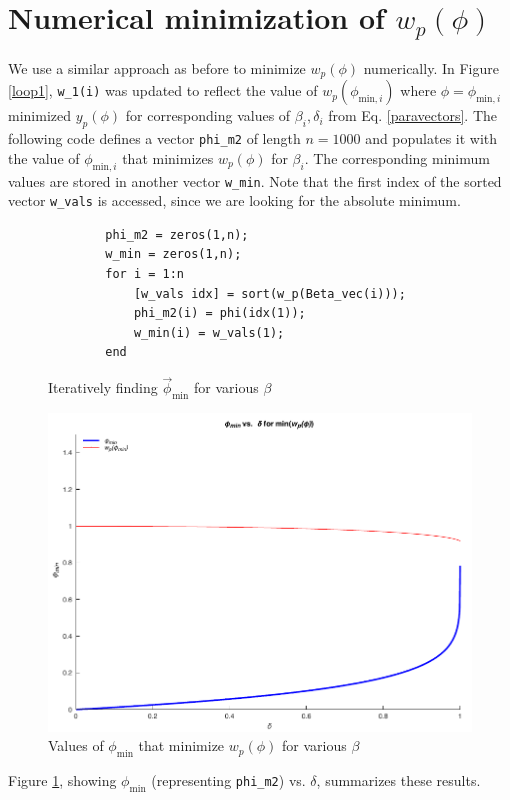 \section{Numerical minimization of \texorpdfstring{$w_p(\phi)$}{}}

We use a similar approach as before to minimize $w_p(\phi)$ numerically. 
In Figure \ref{loop1}, \verb|w_1(i)| was updated
to reflect the value of $w_p(\phi_{\mathrm{min},i})$ where $\phi=\phi_{\mathrm{min},i}$ minimized $y_p(\phi)$ for corresponding values of $\beta_i,\delta_i$
from Eq. \ref{paravectors}. The following code defines a vector \verb|phi_m2| of length $n=1000$ and populates it with the value of $\phi_{\mathrm{min},i}$ that minimizes $w_p(\phi)$ for $\beta_i$.
The corresponding minimum values are stored in another vector \verb|w_min|. Note that the first index of the sorted vector \verb|w_vals| is accessed, since we are looking for the absolute minimum.

\begin{figure}[H]
    \begin{verbatim}
        phi_m2 = zeros(1,n);
        w_min = zeros(1,n);
        for i = 1:n
            [w_vals idx] = sort(w_p(Beta_vec(i)));
            phi_m2(i) = phi(idx(1));
            w_min(i) = w_vals(1);
        end
    \end{verbatim}
    \caption{Iteratively finding $\vec\phi_\mathrm{min}$ for various $\beta$}
\end{figure}

\begin{figure}[H]
    \includegraphics{plots/phi_delta_min.pdf}
    \caption{Values of $\phi_\mathrm{min}$ that minimize $w_p(\phi)$ for various $\beta$}\label{wminplot}
\end{figure}

Figure \ref{wminplot}, showing $\phi_\mathrm{min}$ (representing \verb|phi_m2|) vs. $\delta$, summarizes these results.